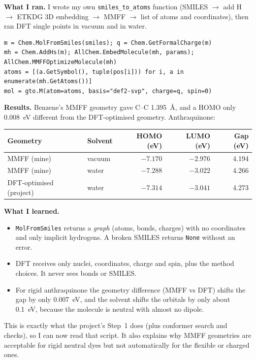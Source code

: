 \documentclass[11pt,a4paper]{article}
\begin{document}
\textbf{What I ran.} I wrote my own \texttt{smiles\_to\_atoms} function (SMILES $\to$ add H $\to$
ETKDG 3D embedding $\to$ MMFF $\to$ list of atoms and coordinates), then ran DFT single points in
vacuum and in water.

\begin{lstlisting}
m = Chem.MolFromSmiles(smiles); q = Chem.GetFormalCharge(m)
mh = Chem.AddHs(m); AllChem.EmbedMolecule(mh, params); AllChem.MMFFOptimizeMolecule(mh)
atoms = [(a.GetSymbol(), tuple(pos[i])) for i, a in enumerate(mh.GetAtoms())]
mol = gto.M(atom=atoms, basis="def2-svp", charge=q, spin=0)
\end{lstlisting}

\textbf{Results.} Benzene's MMFF geometry gave C--C 1.395~\AA, and a HOMO only 0.008~eV different
from the DFT-optimised geometry. Anthraquinone:

\begin{center}\small
\begin{tabular}{@{}llrrr@{}}
\toprule
Geometry & Solvent & HOMO (eV) & LUMO (eV) & Gap (eV) \\
\midrule
MMFF (mine) & vacuum & $-7.170$ & $-2.976$ & 4.194 \\
MMFF (mine) & water & $-7.288$ & $-3.022$ & 4.266 \\
DFT-optimised (project) & water & $-7.314$ & $-3.041$ & 4.273 \\
\bottomrule
\end{tabular}
\end{center}

\textbf{What I learned.}
\begin{itemize}
  \item \texttt{MolFromSmiles} returns a \emph{graph} (atoms, bonds, charges) with no coordinates
  and only implicit hydrogens. A broken SMILES returns \texttt{None} without an error.
  \item DFT receives only nuclei, coordinates, charge and spin, plus the method choices. It never
  sees bonds or SMILES.
  \item For rigid anthraquinone the geometry difference (MMFF vs DFT) shifts the gap by only
  0.007~eV, and the solvent shifts the orbitals by only about 0.1~eV, because the molecule is
  neutral with almost no dipole.
\end{itemize}

\begin{matters}
This is exactly what the project's Step~1 does (plus conformer search and checks), so I can now
read that script. It also explains why MMFF geometries are acceptable for rigid neutral dyes but
not automatically for the flexible or charged ones.
\end{matters}
\end{document}
